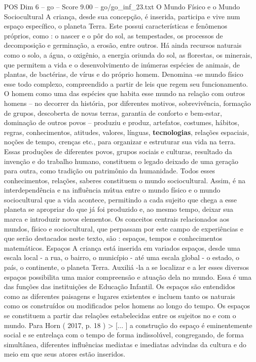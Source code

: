 \begin{textsample}{POS Dim 6 – go – Score 9.00 – go/go\_inf\_23.txt}
O Mundo Físico e o Mundo Sociocultural A criança, desde sua concepção, é inserida, participa e vive num espaço específico, o planeta Terra.
Este possui características e fenômenos próprios, como : o nascer e o pôr do sol, as tempestades, os processos de decomposição e germinação, a erosão, entre outros.
Há ainda recursos naturais como o solo, a água, o oxigênio, a energia oriunda do sol, as florestas, os minerais, que permitem a vida e o desenvolvimento de inúmeras espécies de animais, de plantas, de bactérias, de vírus e do próprio homem.
Denomina -se mundo físico esse todo complexo, compreendido a partir de leis que regem seu funcionamento.
O homem como uma das espécies que habita esse mundo na relação com outros homens – no decorrer da história, por diferentes motivos, sobrevivência, formação de grupos, descoberta de novas terras, garantia de conforto e bem-estar, dominação de outros povos – produziu e produz, artefatos, costumes, hábitos, regras, conhecimentos, atitudes, valores, línguas, \textbf{tecnologias}, relações espaciais, noções de tempo, crenças etc., para organizar e estruturar sua vida na terra.
Essas produções de diferentes povos, grupos sociais e culturas, resultado da invenção e do trabalho humano, constituem o legado deixado de uma geração para outra, como tradição ou patrimônio da humanidade.
Todos esses conhecimentos, relações, saberes constituem o mundo sociocultural.
Assim, é na interdependência e na influência mútua entre o mundo físico e o mundo sociocultural que a vida acontece, permitindo a cada sujeito que chega a esse planeta se apropriar do que já foi produzido e, ao mesmo tempo, deixar sua marca e introduzir novos elementos.
Os conceitos centrais relacionados aos mundos, físico e sociocultural, que perpassam por este campo de experiências e que serão destacados neste texto, são : espaços, tempos e conhecimentos matemáticos.
Espaços A criança está inserida em variados espaços, desde uma escala local - a rua, o bairro, o município - até uma escala global - o estado, o país, o continente, o planeta Terra.
Auxiliá -la a se localizar e a ler esses diversos espaços possibilita uma maior compreensão e atuação dela no mundo.
Essa é uma das funções das instituições de Educação Infantil.
Os espaços são entendidos como as diferentes paisagens e lugares existentes e incluem tanto os naturais como os construídos ou modificados pelos homens ao longo do tempo.
Os espaços se constituem a partir das relações estabelecidas entre os sujeitos no e com o mundo.
Para Horn ( 2017, p. 18 ) > [... ] a construção do espaço é eminentemente social e se entrelaça com o tempo de forma indissolúvel, congregando, de forma simultânea, diferentes influências mediatas e imediatas advindas da cultura e do meio em que seus atores estão inseridos.

\end{textsample}
